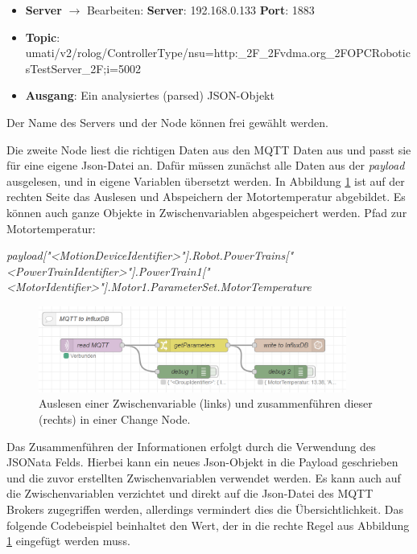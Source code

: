 \documentclass[a4paper, 12pt, oneside, toc=listofnumbered, bibliography=totoc]{scrbook}
\begin{document}
			\begin{itemize}
				\item \textbf{Server} $\rightarrow$ Bearbeiten:
				\subitem \textbf{Server}: 192.168.0.133
				\subitem \textbf{Port}: 1883
				\item \textbf{Topic}: umati/v2/rolog/ControllerType/nsu=http:\_2F\_2Fvdma.org\_2FOPCRobotics\linebreak TestServer\_2F;i=5002
				\item \textbf{Ausgang}: Ein analysiertes (parsed) JSON-Objekt
			\end{itemize}
			Der Name des Servers und der Node können frei gewählt werden.
			
			Die zweite Node liest die richtigen Daten aus den MQTT Daten aus und passt sie für eine eigene Json-Datei an. Dafür müssen zunächst alle Daten aus der \textit{payload} ausgelesen, und in eigene Variablen übersetzt werden. In Abbildung \ref{fig:NodeRedChange} ist auf der rechten Seite das Auslesen und Abspeichern der Motortemperatur abgebildet. Es können auch ganze Objekte in Zwischenvariablen abgespeichert werden. Pfad zur Motortemperatur:
			
			\textit{payload["<MotionDeviceIdentifier>"].Robot.PowerTrains["<PowerTrainIdentifier>"]\linebreak.PowerTrain1["<MotorIdentifier>"].Motor1.ParameterSet.MotorTemperature}
			
			\begin{figure}[H]
				\centering
				\includegraphics[width=0.9\textwidth]{res/NodeRedFlow.png}
				\caption{Auslesen einer Zwischenvariable (links) und zusammenführen dieser (rechts) in einer Change Node.}
				\label{fig:NodeRedChange}
			\end{figure}
			
			Das Zusammenführen der Informationen erfolgt durch die Verwendung des JSONata Felds. Hierbei kann ein neues Json-Objekt in die Payload geschrieben und die zuvor erstellten Zwischenvariablen verwendet werden. Es kann auch auf die Zwischenvariablen verzichtet und direkt auf die Json-Datei des MQTT Brokers zugegriffen werden, allerdings vermindert dies die Übersichtlichkeit. Das folgende Codebeispiel beinhaltet den Wert, der in die rechte Regel aus Abbildung \ref{fig:NodeRedChange} eingefügt werden muss.
			
\end{document}

